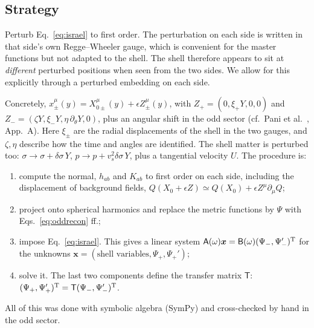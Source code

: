 \documentclass[11pt,a4paper]{article}
\numberwithin{equation}{section}
\begin{document}
\subsection{Strategy}
\begin{keyidea}
Perturb Eq.~\eqref{eq:israel} to first order. The perturbation on each side is written in that side's own
Regge--Wheeler gauge, which is convenient for the master functions but not adapted to the shell. The shell therefore
appears to sit at \emph{different} perturbed positions when seen from the two sides. We allow for this explicitly
through a perturbed embedding on each side.
\end{keyidea}
Concretely, $x^\mu_\pm(y)=X^\mu_{0\pm}(y)+\epsilon Z^\mu_\pm(y)$, with $Z_+=(0,\xi_+Y,0,0)$ and
$Z_-=(\zeta Y,\xi_-Y,\eta\,\partial_\theta Y,0)$, plus an angular shift in the odd sector (cf.\ Pani et al.\ \cite{Pani09},
App.~A). Here $\xi_\pm$ are the radial displacements of the shell in the two gauges, and $\zeta,\eta$ describe how the
time and angles are identified. The shell matter is perturbed too: $\sigma\to\sigma+\delta\sigma\,Y$,
$p\to p+v_s^2\delta\sigma\,Y$, plus a tangential velocity $U$. The procedure is:
\begin{enumerate}
\item compute the normal, $h_{ab}$ and $K_{ab}$ to first order on each side, including the displacement of background
fields, $Q(X_0+\epsilon Z)\simeq Q(X_0)+\epsilon Z^\mu\partial_\mu Q$;
\item project onto spherical harmonics and replace the metric functions by $\Psi$ with Eqs.~\eqref{eq:oddrecon} ff.;
\item impose Eq.~\eqref{eq:israel}. This gives a linear system $\mathsf A(\omega)\bm x=\mathsf B(\omega)(\Psi_-,\Psi_-')^{\rm T}$
for the unknowns $\bm x=(\text{shell variables},\Psi_+,\Psi_+')$;
\item solve it. The last two components define the transfer matrix $\mathsf T$:
$(\Psi_+,\Psi_+')^{\rm T}=\mathsf T(\Psi_-,\Psi_-')^{\rm T}$.
\end{enumerate}
All of this was done with symbolic algebra (SymPy) and cross-checked by hand in the odd sector.
\end{document}
